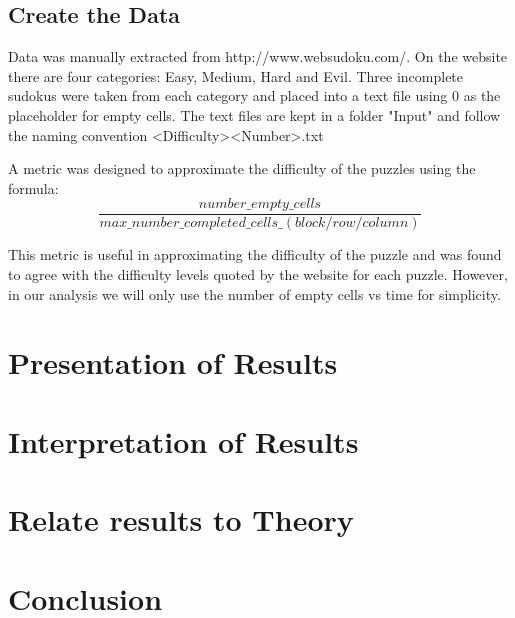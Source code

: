 \documentclass{article}
\begin{document}
\subsection{Create the Data}
Data was manually extracted from http://www.websudoku.com/. On the website there are four categories: Easy, Medium, Hard and Evil. Three incomplete sudokus were taken from each category and placed into a text file using 0 as the placeholder for empty cells. The text files are kept in a folder "Input" and follow the naming convention <Difficulty><Number>.txt

A metric was designed to approximate the difficulty of the puzzles using the formula: \[\frac{number\_empty\_cells}{max\_number\_completed\_cells\_(block/row/column)}\]

This metric is useful in approximating the difficulty of the puzzle and was found to agree with the difficulty levels quoted by the website for each puzzle. However, in our analysis we will only use the number of empty cells vs time for simplicity.

\section{Presentation of Results}

\section{Interpretation of Results}

\section{Relate results to Theory}

\section{Conclusion}
\end{document}
